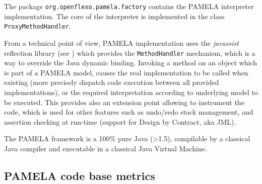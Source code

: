 The package \texttt{org.openflexo.pamela.factory} contains the PAMELA interpreter implementation. The core of the interpreter is implemented in the class \texttt{ProxyMethodHandler}.

From a technical point of view, PAMELA implementation uses the \emph{javassist} reflection library (see \cite{shigueru2000}) which provides the \texttt{MethodHandler} mechanism, which is a way to override the Java dynamic binding. Invoking a method on an object which is part of a PAMELA model, causes the real implementation to be called when existing (more precisely dispatch code execution between all provided implementations), or the required interpretation according to underlying model to be executed. This provides also an extension point allowing to instrument the code, which is used for other features such as undo/redo stack management, and assertion checking at run-time (support for Design by Contract, aka JML).

The PAMELA framework is a 100\% pure Java (\textgreater 1.5), compilable by a classical Java compiler and executable in a classical Java Virtual Machine.

\subsection{PAMELA code base metrics}


